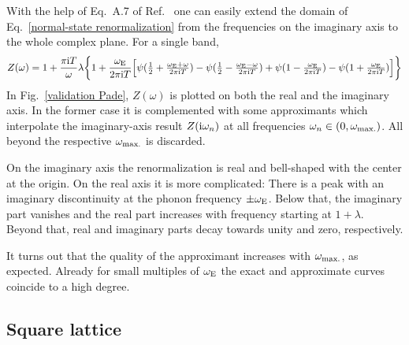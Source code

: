 With the help of Eq.~A.7 of Ref.~ one can easily
extend the domain of Eq.~\ref{normal-state renormalization} from the
 frequencies on the imaginary axis to the whole complex plane.
For a single band,
%
\begin{equation*}
    Z(\omega) = 1 + \frac {\pi \mathrm i T} \omega \lambda \bigg \{
        1 + \frac{\omega \sb{\text{E}}}{2 \pi \mathrm i T} \Big[
              \psi(\tfrac 1 2 + \tfrac{\omega \sb{\text{E}} + \omega}{2 \pi \mathrm i T})
            - \psi(\tfrac 1 2 - \tfrac{\omega \sb{\text{E}} - \omega}{2 \pi \mathrm i T})
            + \psi(1 - \tfrac{\omega \sb{\text{E}}}{2 \pi \mathrm i T})
            - \psi(1 + \tfrac{\omega \sb{\text{E}}}{2 \pi \mathrm i T})
        \Big]
    \bigg \}
\end{equation*}
%
In Fig.~\ref{validation Pade}, $Z(\omega)$ is plotted on both the real and the
imaginary axis. In the former case it is complemented with some 
approximants which interpolate the imaginary-axis result $Z(\mathrm i \omega_n)$ at all
 frequencies $\omega_n \in (0, \omega \sb{\text{max.}})$. All beyond
the respective $\omega \sb{\text{max.}}$ is discarded.

On the imaginary axis the renormalization is real and bell-shaped with the
center at the origin. On the real axis it is more complicated: There is a peak
with an imaginary discontinuity at the phonon frequency $\pm \omega \sb{\text{E}}$.
Below that, the imaginary part vanishes and the real part increases with
frequency starting at $1 + \lambda$. Beyond that, real and imaginary parts decay
towards unity and zero, respectively.

It turns out that the quality of the  approximant increases with
$\omega \sb{\text{max.}}$, as expected. Already for small multiples of $\omega \sb{\text{E}}$
the exact and approximate curves coincide to a high degree.

\subsection{Square lattice}

